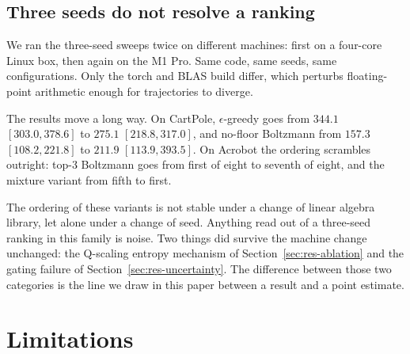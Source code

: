 \documentclass[11pt,a4paper]{article}
\begin{document}
\subsection{Three seeds do not resolve a ranking}
\label{sec:res-repro}

We ran the three-seed sweeps twice on different machines: first on a four-core
Linux box, then again on the M1 Pro. Same code, same seeds, same
configurations. Only the torch and BLAS build differ, which perturbs
floating-point arithmetic enough for trajectories to diverge.

The results move a long way. On CartPole, $\epsilon$-greedy goes from $344.1$
$[303.0, 378.6]$ to $275.1$ $[218.8, 317.0]$, and no-floor Boltzmann from
$157.3$ $[108.2, 221.8]$ to $211.9$ $[113.9, 393.5]$. On Acrobot the ordering
scrambles outright: top-3 Boltzmann goes from first of eight to seventh of
eight, and the mixture variant from fifth to first.

The ordering of these variants is not stable under a change of linear algebra
library, let alone under a change of seed. Anything read out of a three-seed
ranking in this family is noise. Two things did survive the machine change
unchanged: the Q-scaling entropy mechanism of
Section~\ref{sec:res-ablation} and the gating failure of
Section~\ref{sec:res-uncertainty}. The difference between those two categories
is the line we draw in this paper between a result and a point estimate.

\section{Limitations}
\label{sec:limitations}
\end{document}
